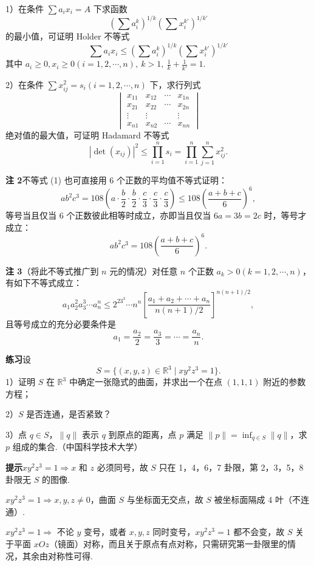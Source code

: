 \documentclass[UTF8,12pt,a4paper,fontset=fandol]{ctexart}
\begin{document}
1）在条件 $\sum a_ix_i=A$ 下求函数
\[
  \left(\sum a_i^k\right)^{1/k}\left(\sum x_i^{k'}\right)^{1/k'}
\]
的最小值，可证明 Holder 不等式
\[
  \sum a_ix_i\le
  \left(\sum a_i^k\right)^{1/k}
  \left(\sum x_i^{k'}\right)^{1/k'}
\]
其中 $a_i\ge0,x_i\ge0(i=1,2,\cdots,n),\ k>1,\ \frac1k+\frac1{k'}=1$.

2）在条件 $\sum x_{ij}^2=s_i(i=1,2,\cdots,n)$ 下，求行列式
\[
  \begin{vmatrix}
    x_{11}&x_{12}&\cdots&x_{1n}\\
    x_{21}&x_{22}&\cdots&x_{2n}\\
    \vdots&\vdots&&\vdots\\
    x_{n1}&x_{n2}&\cdots&x_{nn}
  \end{vmatrix}
\]
绝对值的最大值，可证明 Hadamard 不等式
\[
  |\det(x_{ij})|^2\le
  \prod_{i=1}^{n}s_i=
  \prod_{i=1}^{n}\sum_{j=1}^{n}x_{ij}^2.
\]

\noindent\textbf{注 2}\quad 不等式 (1) 也可直接用 6 个正数的平均值不等式证明：
\[
  ab^2c^3=108\left(a\cdot\frac b2\cdot\frac b2\cdot
  \frac c3\cdot\frac c3\cdot\frac c3\right)
  \le108\left(\frac{a+b+c}{6}\right)^6,
\]
等号当且仅当 6 个正数彼此相等时成立，亦即当且仅当 $6a=3b=2c$ 时，等号才成立：
\[
  ab^2c^3=108\left(\frac{a+b+c}{6}\right)^6.
\]

\noindent\textbf{注 3}\quad （将此不等式推广到 $n$ 元的情况）对任意 $n$ 个正数 $a_k>0(k=1,2,\cdots,n)$，有如下不等式成立：
\[
  a_1a_2^2a_3^3\cdots a_n^n
  \le2^23^3\cdots n^n
  \left[\frac{a_1+a_2+\cdots+a_n}{n(n+1)/2}\right]^{n(n+1)/2},
\]
且等号成立的充分必要条件是
\[
  a_1=\frac{a_2}{2}=\frac{a_3}{3}=\cdots=\frac{a_n}{n}.
\]

\noindent\textbf{练习}\quad 设
\[
  S=\{(x,y,z)\in\mathbb{R}^3\mid xy^2z^3=1\}.
\]
1）证明 $S$ 在 $\mathbb{R}^3$ 中确定一张隐式的曲面，并求出一个在点 $(1,1,1)$ 附近的参数方程；

2）$S$ 是否连通，是否紧致？

3）点 $q\in S$，$\|q\|$ 表示 $q$ 到原点的距离，点 $p$ 满足 $\|p\|=\inf_{q\in S}\|q\|$，求 $p$ 组成的集合.（中国科学技术大学）

\noindent\textbf{提示}\quad $xy^2z^3=1\Rightarrow x$ 和 $z$ 必须同号，故 $S$ 只在 1，4，6，7 卦限，第 2，3，5，8 卦限无 $S$ 的图像.

$xy^2z^3=1\Rightarrow x,y,z\ne0$，曲面 $S$ 与坐标面无交点，故 $S$ 被坐标面隔成 4 叶（不连通）.

$xy^2z^3=1\Rightarrow$ 不论 $y$ 变号，或者 $x,y,z$ 同时变号，$xy^2z^3=1$ 都不会变，故 $S$ 关于平面 $xOz$（镜面）对称，而且关于原点有点对称，只需研究第一卦限里的情况，其余由对称性可得.
\end{document}

